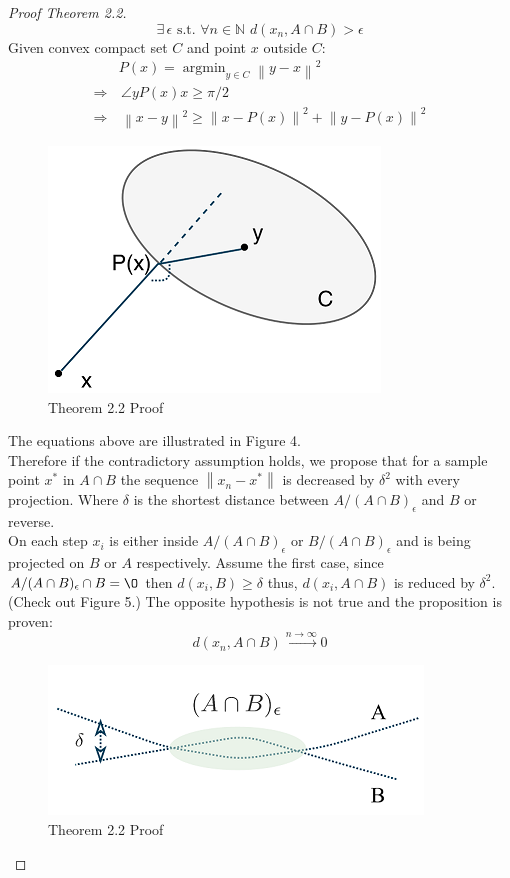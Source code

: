 \documentclass{amsart}
\theoremstyle{definition}
\theoremstyle{remark}
\numberwithin{equation}{section}
\newcommand\norm[1]{\left\lVert#1\right\rVert}
\newcommand{\blankbox}[2]{%
  \parbox{\columnwidth}{\centering
    \setlength{\fboxsep}{0pt}%
    \fbox{\raisebox{0pt}[#2]{\hspace{#1}}}%
  }%
}
\DeclareMathOperator*{\argmin}{argmin}
\begin{document}
\begin{proof}[Proof Theorem 2.2]

\[
\exists \, \epsilon \,\, \text{s.t.} \,\, \forall n\in \mathbb{N}\,\,d(x_n,A\cap B)>\epsilon
\]
Given convex compact set $C$ and point $x$ outside $C$: 
\[
\begin{split}
& P(x) = \argmin_{y\in C} \norm{y-x}^2\\ \Rightarrow & \, \angle yP(x)x\geq\pi/2\\
\Rightarrow & \,\norm{x-y}^2\geq \norm{x-P(x)}^2+\norm{y-P(x)}^2
\end{split}
\]
\begin{figure}[tb]
\includegraphics{proof1.png}
\caption{Theorem 2.2 Proof}
\label{firstfig}
\end{figure}
The equations above are illustrated in Figure 4.\\
Therefore if the contradictory assumption holds, we propose that for a sample point $x^*$ in $A\cap B$ the sequence $\norm{x_n-x^*}$ is decreased by $\delta^2$ with every projection. Where $\delta$ is the shortest distance between $A/(A\cap B)_\epsilon$ and $B$ or reverse.\\
On each step $x_i$ is either inside $A/(A\cap B)_\epsilon$ or $B/(A\cap B)_\epsilon$ and is being projected on $B$ or $A$ respectively. Assume the first case, since $A/(A\cap B)_\epsilon \cap B = \O$ then $d(x_i,B)\geq \delta$ thus, $d(x_i,A\cap B)$ is reduced by $\delta^2$. (Check out Figure 5.) The opposite hypothesis is not true and the proposition is proven:
\[
d(x_n,A\cap B) \xrightarrow{n\rightarrow \infty} 0
\]

\begin{figure}[tb]
\includegraphics{proof2.png}
\caption{Theorem 2.2 Proof}
\label{firstfig}
\end{figure}


\end{proof}
\end{document}
